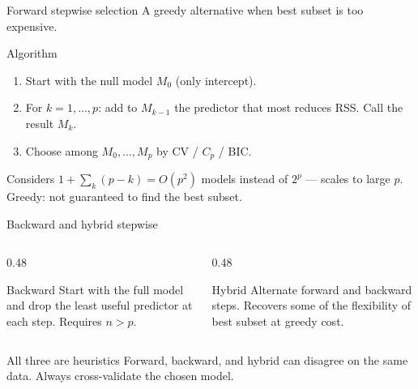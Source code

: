 \documentclass[aspectratio=169,11pt]{beamer}
\begin{document}
\begin{frame}{Forward stepwise selection}
  A greedy alternative when best subset is too expensive.
  \begin{block}{Algorithm}
    \begin{enumerate}
      \item Start with the null model $M_0$ (only intercept).
      \item For $k = 1, \ldots, p$: add to $M_{k-1}$ the predictor that
            most reduces RSS. Call the result $M_k$.
      \item Choose among $M_0, \ldots, M_p$ by CV / $C_p$ / BIC.
    \end{enumerate}
  \end{block}
  \begin{readme}
    Considers $1 + \sum_k (p - k) = O(p^2)$ models instead of $2^p$
    --- scales to large $p$. Greedy: not guaranteed to find the best
    subset.
  \end{readme}
\end{frame}

\begin{frame}{Backward and hybrid stepwise}
  \begin{columns}[T]
    \begin{column}{0.48\textwidth}
      \begin{block}{Backward}
        Start with the full model and drop the least useful predictor
        at each step. Requires $n > p$.
      \end{block}
    \end{column}
    \begin{column}{0.48\textwidth}
      \begin{block}{Hybrid}
        Alternate forward and backward steps. Recovers some of the
        flexibility of best subset at greedy cost.
      \end{block}
    \end{column}
  \end{columns}
  \begin{alertblock}{All three are heuristics}
    Forward, backward, and hybrid can disagree on the same data.
    Always cross-validate the chosen model.
  \end{alertblock}
\end{frame}
\end{document}
